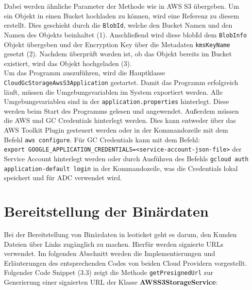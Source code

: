 Dabei werden ähnliche Parameter der Methode wie in AWS S3 übergeben. Um ein Objekt in einen Bucket hochladen zu können, wird eine Referenz zu diesem erstellt. Dies geschieht durch die \verb|BlobId|, welche den Bucket Namen und den Namen des Objekts beinhaltet (1). 
Anschließend wird diese blobId dem \verb|BlobInfo| Objekt übergeben und der Encryption Key über die Metadaten \verb|kmsKeyName| gesetzt (2). Nachdem überprüft worden ist, ob das Objekt bereits im Bucket existiert, wird das Objekt hochgeladen (3).\\

Um das Programm auszuführen, wird die Hauptklasse \verb|CloudGcStorageAwsS3Application| gestartet. Damit das Programm erfolgreich läuft, müssen die Umgebungsvariablen im System exportiert werden. Alle Umgebungsvariablen sind in der \verb|application.properties| hinterlegt. Diese werden beim Start des Programms gelesen und angewendet. Außerdem müssen die AWS und GC Credentials hinterlegt werden. Dies kann entweder über das AWS Toolkit Plugin gesteuert werden oder in der Kommandozeile mit dem Befehl \verb|aws configure|. Für GC Credentials kann mit dem Befehl:\\ \verb|export GOOGLE_APPLICATION_CREDENTIALS=<service-account-json-file>| der Service Account hinterlegt werden oder durch Ausführen des Befehls \verb|gcloud auth application-default login| in der Kommandozeile, was die Credentials lokal speichert und für ADC verwendet wird.

\newpage

\section{Bereitstellung der Binärdaten}

Bei der Bereitstellung von Binärdaten in leoticket geht es darum, den Kunden Dateien über Links zugänglich zu machen. Hierfür werden signierte URLs verwendet. Im folgenden Abschnitt werden die Implementierungen und Erläuterungen des entsprechenden Codes von beiden Cloud Providern vorgestellt.\\

Folgender Code Snippet (3.3) zeigt die Methode \verb|getPresignedUrl| zur Generierung einer signierten URL der Klasse \textbf{AWSS3StorageService}:

